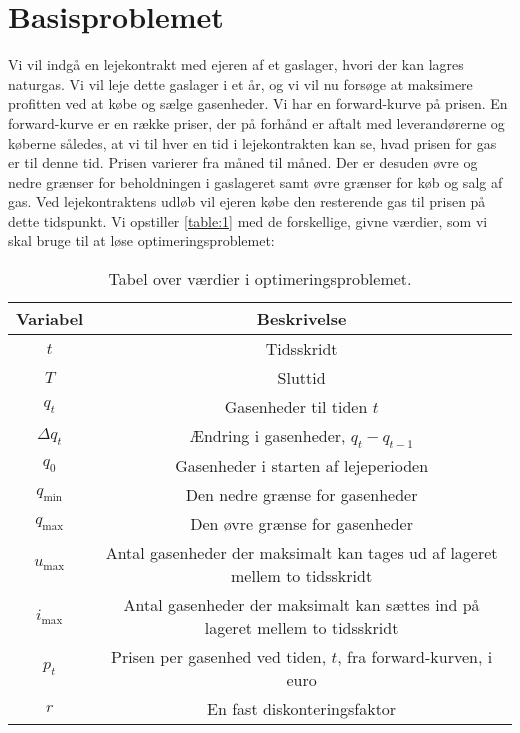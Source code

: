 \section{Basisproblemet}
Vi vil indgå en lejekontrakt med ejeren af et gaslager, hvori der kan lagres naturgas. Vi vil leje dette gaslager i et år, og vi vil nu forsøge at maksimere profitten ved at købe og sælge gasenheder. Vi har en forward-kurve på prisen. En forward-kurve er en række priser, der på forhånd er aftalt med leverandørerne og køberne således, at vi til hver en tid i lejekontrakten kan se, hvad prisen for gas er til denne tid. Prisen varierer fra måned til måned. Der er desuden øvre og nedre grænser for beholdningen i gaslageret samt øvre grænser for køb og salg af gas. Ved lejekontraktens udløb vil ejeren købe den resterende gas til prisen på dette tidspunkt. Vi opstiller \autoref{table:1} med de forskellige, givne værdier, som vi skal bruge til at løse optimeringsproblemet:

\begin{table}[H]
\centering
\begin{tabular}{|c | c|} 
 \hline
 Variabel & Beskrivelse \\ [0.5ex] 
 \hline\hline
 $t$ & Tidsskridt  \\ 
 $T$ & Sluttid  \\
 $q_{t}$ & Gasenheder til tiden $t$  \\
 $\Delta q_{t}$ & Ændring i gasenheder,    $q_{t}-q_{t-1}$ \\
 $q_{0}$ & Gasenheder i starten af lejeperioden  \\
 $q_{\min}$ & Den nedre grænse for gasenheder \\ 
 $q_{\max}$ & Den øvre grænse for gasenheder \\
 $u_{\max}$ & Antal gasenheder der maksimalt kan tages ud af lageret mellem to tidsskridt \\ 
 $i_{\max}$ & Antal gasenheder der maksimalt kan sættes ind på lageret mellem to tidsskridt \\ 
 $p_{t}$ & Prisen per gasenhed ved tiden, $t$, fra forward-kurven, i euro  \\
 $r$ & En fast diskonteringsfaktor  \\
 [1ex]
 \hline
\end{tabular}
\caption{Tabel over værdier i optimeringsproblemet.}
\label{table:1}
\end{table}


